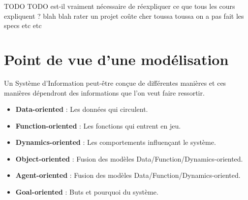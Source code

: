TODO TODO est-il vraiment nécessaire de réexpliquer ce que tous les cours expliquent ? blah blah rater un projet coûte cher toussa toussa on a pas fait les specs etc etc

\section{Point de vue d'une modélisation}

Un Système d'Information peut-être conçue de différentes manières et ces manières dépendront des informations que l'on veut faire ressortir.

\begin{itemize}
  \item \textbf{Data-oriented} : Les données qui circulent.
  \item \textbf{Function-oriented} : Les fonctions qui entrent en jeu.
  \item \textbf{Dynamics-oriented} : Les comportements influençant le système.
  \item \textbf{Object-oriented} : Fusion des modèles {Data/Function/Dynamics}-oriented.
  \item \textbf{Agent-oriented} : Fusion des modèles {Data/Function/Dynamics}-oriented.
  \item \textbf{Goal-oriented} : Buts et pourquoi du système.
\end{itemize}
